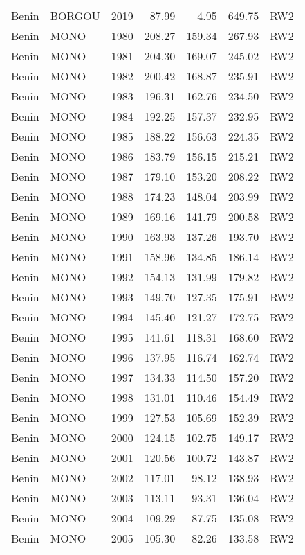 \begin{longtable}{lllrrrl}
  Benin & BORGOU & 2019 & 87.99 & 4.95 & 649.75 & RW2 \\ 
  Benin & MONO & 1980 & 208.27 & 159.34 & 267.93 & RW2 \\ 
  Benin & MONO & 1981 & 204.30 & 169.07 & 245.02 & RW2 \\ 
  Benin & MONO & 1982 & 200.42 & 168.87 & 235.91 & RW2 \\ 
  Benin & MONO & 1983 & 196.31 & 162.76 & 234.50 & RW2 \\ 
  Benin & MONO & 1984 & 192.25 & 157.37 & 232.95 & RW2 \\ 
  Benin & MONO & 1985 & 188.22 & 156.63 & 224.35 & RW2 \\ 
  Benin & MONO & 1986 & 183.79 & 156.15 & 215.21 & RW2 \\ 
  Benin & MONO & 1987 & 179.10 & 153.20 & 208.22 & RW2 \\ 
  Benin & MONO & 1988 & 174.23 & 148.04 & 203.99 & RW2 \\ 
  Benin & MONO & 1989 & 169.16 & 141.79 & 200.58 & RW2 \\ 
  Benin & MONO & 1990 & 163.93 & 137.26 & 193.70 & RW2 \\ 
  Benin & MONO & 1991 & 158.96 & 134.85 & 186.14 & RW2 \\ 
  Benin & MONO & 1992 & 154.13 & 131.99 & 179.82 & RW2 \\ 
  Benin & MONO & 1993 & 149.70 & 127.35 & 175.91 & RW2 \\ 
  Benin & MONO & 1994 & 145.40 & 121.27 & 172.75 & RW2 \\ 
  Benin & MONO & 1995 & 141.61 & 118.31 & 168.60 & RW2 \\ 
  Benin & MONO & 1996 & 137.95 & 116.74 & 162.74 & RW2 \\ 
  Benin & MONO & 1997 & 134.33 & 114.50 & 157.20 & RW2 \\ 
  Benin & MONO & 1998 & 131.01 & 110.46 & 154.49 & RW2 \\ 
  Benin & MONO & 1999 & 127.53 & 105.69 & 152.39 & RW2 \\ 
  Benin & MONO & 2000 & 124.15 & 102.75 & 149.17 & RW2 \\ 
  Benin & MONO & 2001 & 120.56 & 100.72 & 143.87 & RW2 \\ 
  Benin & MONO & 2002 & 117.01 & 98.12 & 138.93 & RW2 \\ 
  Benin & MONO & 2003 & 113.11 & 93.31 & 136.04 & RW2 \\ 
  Benin & MONO & 2004 & 109.29 & 87.75 & 135.08 & RW2 \\ 
  Benin & MONO & 2005 & 105.30 & 82.26 & 133.58 & RW2 \\ 

\end{longtable}
